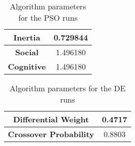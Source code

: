 \begin{table}
	\centering
	\begin{tabular}{ | c | c | }
		\hline
		\textbf{Inertia} & 0.729844 \\ \hline
		\textbf{Social} & 1.496180 \\ \hline
		\textbf{Cognitive} & 1.496180 \\ \hline
	\end{tabular}
	\caption{Algorithm parameters for the PSO runs}
	\label{table:ea-pso-algo}
\end{table}

\begin{table}
	\centering
	\begin{tabular}{ | c | c | }
		\hline
		\textbf{Differential Weight} & 0.4717 \\ \hline
		\textbf{Crossover Probability} & 0.8803 \\ \hline
	\end{tabular}
	\caption{Algorithm parameters for the DE runs}
	\label{table:ea-de-algo}
\end{table}